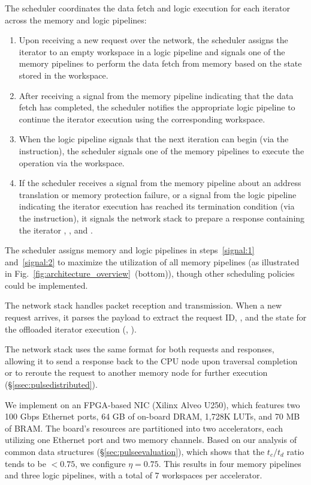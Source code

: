 The scheduler coordinates the data fetch and logic execution for each iterator across the memory and logic pipelines:
\begin{enumerate}[leftmargin=*, itemsep=0pt]
  \item Upon receiving a new request over the network, the scheduler assigns the iterator to an empty workspace in a logic pipeline and signals one of the memory pipelines to perform the data fetch from memory based on the state stored in the workspace.\label{signal:1}
  \item After receiving a signal from the memory pipeline indicating that the data fetch has completed, the scheduler notifies the appropriate logic pipeline to continue the iterator execution using the corresponding workspace.
  \item When the logic pipeline signals that the next iteration can begin (via the  instruction), the scheduler signals one of the memory pipelines to execute the  operation via the workspace.\label{signal:2}
  \item If the scheduler receives a signal from the memory pipeline about an address translation or memory protection failure, or a signal from the logic pipeline indicating the iterator execution has reached its termination condition (via the  instruction), it signals the network stack to prepare a response containing the iterator , , and .
\end{enumerate}
\noindent
The scheduler assigns memory and logic pipelines in steps~\ref{signal:1} and~\ref{signal:2} to maximize the utilization of all memory pipelines (as illustrated in Fig.~\ref{fig:architecture_overview}~(bottom)), though other scheduling policies could be implemented.

 The network stack handles packet reception and transmission. When a new request arrives, it parses the payload to extract the request ID, , and the state for the offloaded iterator execution (, ). 

The network stack uses the same format for both requests and responses, allowing it to send a response back to the CPU node upon traversal completion or to reroute the request to another memory node for further execution (\S\ref{ssec:pulsedistributed}).

 We implement \pulse on an FPGA-based NIC (Xilinx Alveo U250), which features two 100 Gbps Ethernet ports, 64 GB of on-board DRAM, 1,728K LUTs, and 70 MB of BRAM. The board's resources are partitioned into two \pulse accelerators, each utilizing one Ethernet port and two memory channels. Based on our analysis of common data structures (\S\ref{sec:pulseevaluation}), which shows that the $t_c/t_d$ ratio tends to be $< 0.75$, we configure $\eta = 0.75$. This results in four memory pipelines and three logic pipelines, with a total of $7$ workspaces per accelerator.

